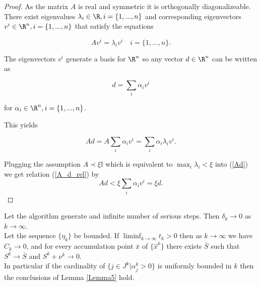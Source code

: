 \begin{proof}
	As the matrix \(A\) is real and symmetric it is orthogonally diagonalizeable.
	There exist eigenvalues \(\lambda_i \in \R, i = \{1,...,n\}\) and corresponding eigenvectors \(v^i \in \R^n, i = \{1,...,n\}\) that satisfy the equations
	
	\begin{equation*}
		Av^i= \lambda_iv^i \quad i = \{1,...,n\}.
		\label{A_d_rel}
	\end{equation*}
	
	The eigenvectors \(v^i\) generate a basis for \(\R^n\) so any vector \(d \in \R^n\) can be written as
	
	\[ d = \sum_{i} {\alpha_i v^i} \]
	
	for \(\alpha_i \in \R^n, i = \{1,...,n\}\).
	
	This yields
	
	\begin{equation}
		Ad = A \sum_i{\alpha_i v^i} = \sum_i \alpha_i \lambda_i v^i.
		\label{Ad}
	\end{equation}
	
	Plugging the assumption \(A \prec \xi \mathbb{I}\) which is equivalent to \(\max_i \lambda_i < \xi\) into (\ref{Ad})
	we get relation (\ref{A_d_rel}) by
		\[Ad < \xi \sum_i \alpha_i v^i = \xi d. \]

\end{proof}

\begin{theorem}
	Let the algorithm generate and infinite number of serious steps. Then \(\delta_k \to 0\) as \(k \to \infty\). \\
	Let the sequence \(\{\eta_k\}\) be bounded. If \(\liminf_{k \to \infty} t_k > 0\) then as \(k \to \infty\) we have \(C_k \to 0\), and for every accumulation point \(\bar{x}\) of \(\{\hat{x}^k\}\) there exists \(\bar{S}\) such that \(S^k \to \bar{S}\) and \(S^k + \nu^k \to 0\). \\
	In particular if the cardinality of \(\{j \in J^k|\alpha_j^k > 0\}\) is uniformly bounded in \(k\) then the conclusions of Lemma \ref{Lemma5} hold.
\end{theorem}

